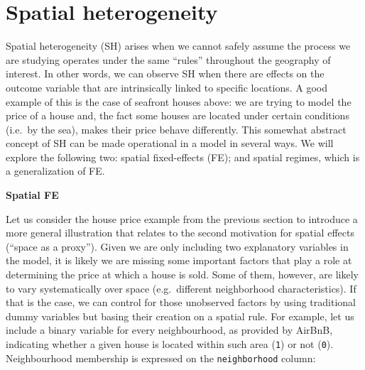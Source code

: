 \documentclass[
]{book}
\newenvironment{Shaded}{\begin{snugshade}}{\end{snugshade}}
\newcommand{\DataTypeTok}[1]{\textcolor[rgb]{0.13,0.29,0.53}{#1}}
\newcommand{\KeywordTok}[1]{\textcolor[rgb]{0.13,0.29,0.53}{\textbf{#1}}}
\newcommand{\NormalTok}[1]{#1}
\newcommand{\OperatorTok}[1]{\textcolor[rgb]{0.81,0.36,0.00}{\textbf{#1}}}
\newcommand{\StringTok}[1]{\textcolor[rgb]{0.31,0.60,0.02}{#1}}
\begin{document}
\hypertarget{spatial-heterogeneity-1}{%
\section{Spatial heterogeneity}\label{spatial-heterogeneity-1}}

Spatial heterogeneity (SH) arises when we cannot safely assume the process we are studying operates under the same ``rules'' throughout the geography of interest. In other words, we can observe SH when there are effects on the outcome variable that are intrinsically linked to specific locations. A good example of this is the case of seafront houses above: we are trying to model the price of a house and, the fact some houses are located under certain conditions (i.e.~by the sea), makes their price behave differently. This somewhat abstract concept of SH can be made operational in a model in several ways. We will explore the following two: spatial fixed-effects (FE); and spatial regimes, which is a generalization of FE.

\textbf{Spatial FE}

Let us consider the house price example from the previous section to introduce a more general illustration that relates to the second motivation for spatial effects (``space as a proxy''). Given we are only including two explanatory variables in the model, it is likely we are missing some important factors that play a role at determining the price at which a house is sold. Some of them, however, are likely to vary systematically over space (e.g.~different neighborhood characteristics). If that is the case, we can control for those unobserved factors by using traditional dummy variables but basing their creation on a spatial rule. For example, let us include a binary variable for every neighbourhood, as provided by AirBnB, indicating whether a given house is located within such area (\texttt{1}) or not (\texttt{0}). Neighbourhood membership is expressed on the \texttt{neighborhood} column:

\begin{Shaded}
\end{Shaded}
\end{document}
